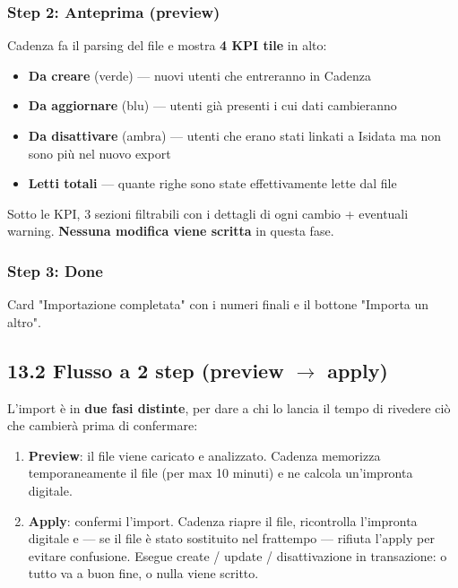 \documentclass[11pt,a4paper]{article}
\begin{document}
\subsubsection{Step 2: Anteprima (preview)}


Cadenza fa il parsing del file e mostra \textbf{4 KPI tile} in alto:

\begin{itemize}
  \item \textbf{Da creare} (verde) --- nuovi utenti che entreranno in Cadenza
  \item \textbf{Da aggiornare} (blu) --- utenti già presenti i cui dati cambieranno
  \item \textbf{Da disattivare} (ambra) --- utenti che erano stati linkati a Isidata ma non sono più nel nuovo export
  \item \textbf{Letti totali} --- quante righe sono state effettivamente lette dal file
\end{itemize}

Sotto le KPI, 3 sezioni filtrabili con i dettagli di ogni cambio + eventuali warning. \textbf{Nessuna modifica viene scritta} in questa fase.

\subsubsection{Step 3: Done}


Card "Importazione completata" con i numeri finali e il bottone "Importa un altro".

\subsection{13.2 Flusso a 2 step (preview $\rightarrow$ apply)}


L'import è in \textbf{due fasi distinte}, per dare a chi lo lancia il tempo di rivedere ciò che cambierà prima di confermare:

\begin{enumerate}
  \item \textbf{Preview}: il file viene caricato e analizzato. Cadenza memorizza temporaneamente il file (per max 10 minuti) e ne calcola un'impronta digitale.
  \item \textbf{Apply}: confermi l'import. Cadenza riapre il file, ricontrolla l'impronta digitale e --- se il file è stato sostituito nel frattempo --- rifiuta l'apply per evitare confusione. Esegue create / update / disattivazione in transazione: o tutto va a buon fine, o nulla viene scritto.
\end{enumerate}
\end{document}
